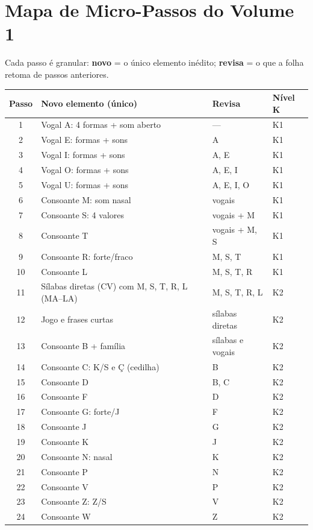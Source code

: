 \section{Mapa de Micro-Passos do Volume 1}

Cada passo é granular: \textbf{novo} = o único elemento inédito; \textbf{revisa}
= o que a folha retoma de passos anteriores.

\begin{center}
\small
\begin{tabular}{|c|l|l|l|}
\hline
\textbf{Passo} & \textbf{Novo elemento (único)} & \textbf{Revisa} & \textbf{Nível K} \\
\hline
1 & Vogal A: 4 formas + som aberto & --- & K1 \\
2 & Vogal E: formas + sons & A & K1 \\
3 & Vogal I: formas + sons & A, E & K1 \\
4 & Vogal O: formas + sons & A, E, I & K1 \\
5 & Vogal U: formas + sons & A, E, I, O & K1 \\
6 & Consoante M: som nasal & vogais & K1 \\
7 & Consoante S: 4 valores & vogais + M & K1 \\
8 & Consoante T & vogais + M, S & K1 \\
9 & Consoante R: forte/fraco & M, S, T & K1 \\
10 & Consoante L & M, S, T, R & K1 \\
11 & Sílabas diretas (CV) com M, S, T, R, L (MA--LA) & M, S, T, R, L & K2 \\
12 & Jogo e frases curtas & sílabas diretas & K2 \\
13 & Consoante B + família & sílabas e vogais & K2 \\
14 & Consoante C: K/S e Ç (cedilha) & B & K2 \\
15 & Consoante D & B, C & K2 \\
16 & Consoante F & D & K2 \\
17 & Consoante G: forte/J & F & K2 \\
18 & Consoante J & G & K2 \\
19 & Consoante K & J & K2 \\
20 & Consoante N: nasal & K & K2 \\
21 & Consoante P & N & K2 \\
22 & Consoante V & P & K2 \\
23 & Consoante Z: Z/S & V & K2 \\
24 & Consoante W & Z & K2 \\

\end{tabular}
\end{center}

